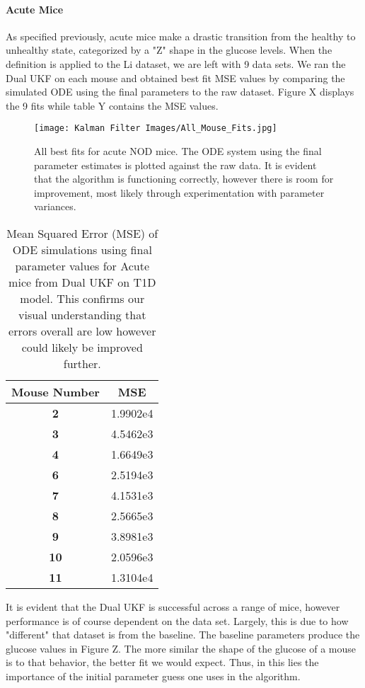 \paragraph{Acute Mice}
As specified previously, acute mice make a drastic transition from the healthy to unhealthy state, categorized by a "Z" shape in the glucose levels. When the definition is applied to the Li dataset, we are left with 9 data sets. We ran the Dual UKF on each mouse and obtained best fit MSE values by comparing the simulated ODE using the final parameters to the raw dataset. Figure X displays the 9 fits while table Y contains the MSE values.\\

\begin{figure}[H]
    \centering
    \texttt{[image: Kalman Filter Images/All\_Mouse\_Fits.jpg]}
    \caption{All best fits for acute NOD mice. The ODE system using the final parameter estimates is plotted against the raw data. It is evident that the algorithm is functioning correctly, however there is room for improvement, most likely through experimentation with parameter variances.}
\end{figure}

\begin{table}[H]
  \begin{center}
    \label{tab:table1}
    \begin{tabular}{c|c} %
      \textbf{Mouse Number} & \textbf{MSE} \\
      \hline
      \textbf{2} & 1.9902e4\\
      \textbf{3} & 4.5462e3\\
      \textbf{4} & 1.6649e3\\
      \textbf{6} & 2.5194e3\\
      \textbf{7} & 4.1531e3\\
      \textbf{8} & 2.5665e3\\
      \textbf{9} & 3.8981e3\\
      \textbf{10} & 2.0596e3\\
      \textbf{11} & 1.3104e4
    \end{tabular}
    \caption{Mean Squared Error (MSE) of ODE simulations using final parameter values for Acute mice from Dual UKF on T1D model. This confirms our visual understanding that errors overall are low however could likely be improved further.}
  \end{center}
\end{table}
It is evident that the Dual UKF is successful across a range of mice, however performance is of course dependent on the data set. Largely, this is due to how "different" that dataset is from the baseline. The baseline parameters produce the glucose values in Figure Z. The more similar the shape of the glucose of a mouse is to that behavior, the better fit we would expect. Thus, in this lies the importance of the initial parameter guess one uses in the algorithm.

